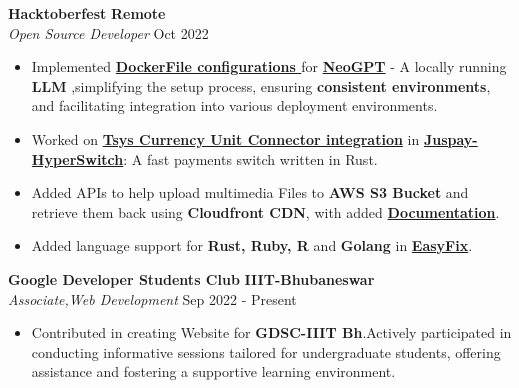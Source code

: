\vspace{-1pt}

\textbf{Hacktoberfest} \hfill \textbf{Remote}\\
\textit{Open Source Developer} \hfill Oct 2022
\vspace{-8pt}
\begin{itemize}
    \setlength{\itemsep}{-1pt}
    \setlength{\parskip}{0pt}
    \item Implemented \href{https://github.com/neokd/NeoGPT/pull/76}{\textbf{\textcolor{linkcolor}{DockerFile configurations }}} for \href{https://neokd.github.io/NeoGPT/}{\textbf{\textcolor{linkcolor}{NeoGPT}}} - A locally running \textbf{LLM} ,simplifying the setup process, ensuring \textbf{consistent environments}, and facilitating integration into various deployment environments.
    \item Worked on \href{https://github.com/juspay/hyperswitch/pull/2749}{\textbf{\textcolor{linkcolor}{Tsys Currency Unit Connector integration}}} in \href{https://github.com/juspay/hyperswitch}{\textbf{\textcolor{linkcolor}{Juspay-HyperSwitch}}}: A fast payments switch written in Rust.
    \item Added APIs to help upload multimedia Files to \textbf{AWS S3 Bucket} and retrieve them back using \textbf{Cloudfront CDN}, with added \href{https://github.com/dishamodi0910/APIVerse}{\textbf{\textcolor{linkcolor}{Documentation}}}.
    \item Added language support for \textbf{Rust, Ruby, R} and \textbf{Golang} in \href{https://github.com/vatsalsinghkv/easy-fix/pull/57}{\textbf{\textcolor{linkcolor}{EasyFix}}}.
\end{itemize} 

\textbf{Google Developer Students Club} \hfill \textbf{IIIT-Bhubaneswar}\\
\textit{Associate,Web Development} \hfill Sep 2022 - Present\\
\vspace{-8pt}
\begin{itemize} 
    \setlength{\itemsep}{-1pt}
    \setlength{\parskip}{0pt}
	\item Contributed in creating Website for \textbf{GDSC-IIIT Bh}.Actively participated in conducting informative sessions tailored for undergraduate students, offering assistance and fostering a supportive learning environment.
\end{itemize}
\vspace{-0.9pt}
